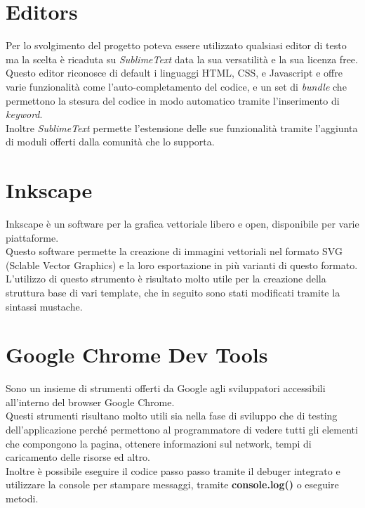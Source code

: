 \section{Editors}
Per lo svolgimento del progetto poteva essere utilizzato qualsiasi editor di testo ma la scelta è ricaduta su \textit{SublimeText} data la sua versatilità e la sua licenza free.\\
Questo editor riconosce di default i linguaggi  HTML, CSS, e Javascript e offre varie funzionalità come l'auto-completamento del codice, e un set di \textit{bundle} che permettono la stesura del codice in modo automatico tramite l'inserimento di \textit{keyword}.\\
Inoltre \textit{SublimeText} permette l'estensione delle sue funzionalità tramite l'aggiunta di moduli offerti dalla comunità che lo supporta.

\section{Inkscape}
Inkscape è un software per la grafica vettoriale libero e open, disponibile per varie piattaforme.\\
Questo software permette la creazione di immagini vettoriali nel formato SVG (Sclable Vector Graphics) e la loro esportazione in più varianti di questo formato.\\
L'utilizzo di questo strumento è risultato molto utile per la creazione della struttura base di vari template, che in seguito sono stati modificati tramite la sintassi mustache.

\section{Google Chrome Dev Tools}\label{sec:chrome}
Sono un insieme di strumenti offerti da Google agli sviluppatori accessibili all'interno del browser Google Chrome.\\
Questi strumenti risultano molto utili sia nella fase di sviluppo che di testing dell'applicazione perché permettono al programmatore di vedere tutti gli elementi che compongono la pagina, ottenere informazioni sul network, tempi di caricamento delle risorse ed altro.\\
Inoltre è possibile eseguire il codice passo passo tramite il debuger integrato e utilizzare la console per stampare messaggi, tramite \textbf{console.log()} o eseguire metodi.
\section{}

